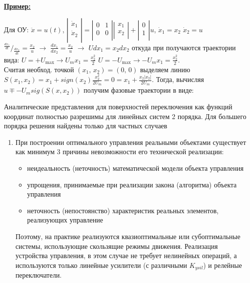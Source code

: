 \documentclass[preprint,russian,a5paper,10pt,twoside,mediummath]{ncc}
\newcommand{\ExampleMy}{\vspace{\baselineskip}\textbf{\underline{Пример:}}\nopagebreak\par}
\begin{document}
\ExampleMy Для ОУ: $\ddot{x}=u\left( t \right)$, $\left| \begin{matrix}
   {{{\dot{x}}}_{1}}  \\
   {{{\dot{x}}}_{2}}  \\
\end{matrix} \right|=\left| \begin{matrix}
   0 & 1  \\
   0 & 0  \\
\end{matrix} \right|\left| \begin{matrix}
   {{x}_{1}}  \\
   {{x}_{2}}  \\
\end{matrix} \right|+\left| \begin{matrix}
   0  \\
   1  \\
\end{matrix} \right|u$, ${{\dot{x}}_{1}}={{x}_{2}}$ ${{\dot{x}}_{2}}=u$
\\${}^{\frac{d{{x}_{1}}}{dt}}/{}_{\frac{d{{x}_{2}}}{dt}}=\frac{{{x}_{2}}}{u}$ $\to $ $\frac{d{{x}_{1}}}{d{{x}_{2}}}=\frac{{{x}_{2}}}{u}$ $\to $ $Ud{{x}_{1}}={{x}_{2}}d{{x}_{2}}$
откуда при получаются траектории вида: $U=+{{U}_{\max }}\to {{U}_{m}}{{x}_{1}}=\frac{x_{2}^{2}}{2}$ 
 $U=-{{U}_{\max }}\to -{{U}_{m}}{{x}_{1}}=\frac{x_{2}^{2}}{2}$.
\\Считая необход. точкой $\left( {{x}_{1}},\,{{x}_{2}} \right)=\left( 0,\,0 \right)$ выделяем линию $S\left( {{x}_{1}},{{x}_{2}} \right)={{x}_{1}}+sign\left( {{x}_{2}} \right)\frac{x_{2}^{2}}{2{{U}_{m}}}=0={{x}_{1}}+\frac{{{x}_{2}}\left| {{x}_{2}} \right|}{2{{U}_{m}}}$. Тогда, вычисляя $u\mp -{{U}_{m}}sig\left( S\left( x,{{x}_{2}} \right) \right)$ получим фазовые траектории в виде:
 \par Аналитические представления для поверхностей переключения как функций координат полностью разрешимы для линейных систем 2 порядка. Для большего порядка решения найдены только для частных случаев 
 \begin{enumerate}[resume]
 \item При построении оптимального управления реальными объектами существует как минимум 3 причины невозможности его технической реализации:
 \begin{itemize}
 \item неидеальность (неточность) математической модели объекта управления
 \item упрощения, принимаемые при реализации закона (алгоритма) объекта управления
 \item неточность (непостоянство) характеристик реальных элементов, реализующих управление
  \end{itemize}
  \par Поэтому, на практике реализуются квазиоптимальные или субоптимальные системы, использующие скользящие режимы движения. Реализация устройства управления, в этом случае не требует нелинейных операций, а используются только линейные усилители (с различными ${{K}_{ysil}}$) и релейные переключатели.
 \end{enumerate}
 
\end{document}
